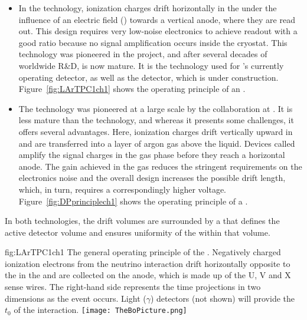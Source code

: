 \begin{itemize}
\item In the  technology, ionization charges drift horizontally in the  under the influence of an electric field (\efield) towards %
a vertical anode, where they are read out. 
This design requires very low-noise electronics to achieve readout with a good  ratio because no signal amplification occurs inside the cryostat. 
This technology was pioneered in the  project, and after several decades of worldwide R\&D, is now mature. It is the technology used for 's currently operating  detector, as well as the  detector, which is under construction. Figure~\ref{fig:LArTPC1ch1} shows the operating principle of an  .

\item The  technology was pioneered at a large scale by the  collaboration at . It is less mature than the  technology, and whereas it presents some challenges, it offers several advantages.  Here, ionization charges drift vertically upward in  and are transferred into a layer of argon gas above the liquid. Devices called  amplify the signal charges in the gas phase before they reach a horizontal anode. The gain achieved in the gas reduces the stringent requirements on the electronics noise and the overall design increases the possible drift length, which, in turn, requires a correspondingly higher voltage. %
Figure~\ref{fig:DPprinciplech1} shows the operating principle of a  . 
\end{itemize}
 In both technologies, the drift volumes are surrounded by a  that defines the active detector volume and ensures uniformity of the \efield within that volume.
 
\begin{dunefigure}{fig:LArTPC1ch1}
{The general operating principle of the  . Negatively charged ionization electrons from the neutrino interaction drift horizontally opposite to the \efield in the  and are collected on the  %
 anode, which is made up of the U, V and X sense wires.  The right-hand side represents the time projections in two dimensions as the event occurs. Light ($\gamma$) detectors (not shown) will provide the $t_0$ of the interaction.}
\texttt{[image: TheBoPicture.png]} 
\end{dunefigure}

